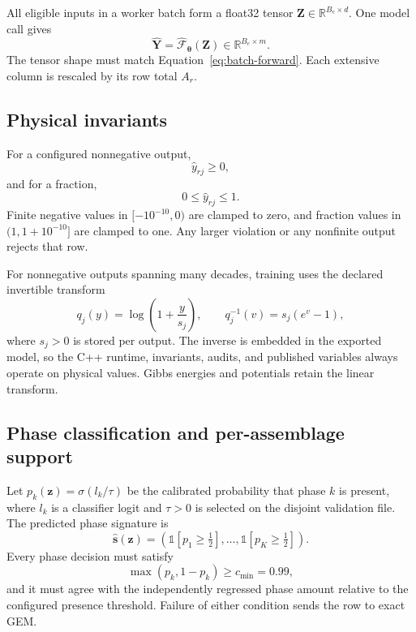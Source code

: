\documentclass[11pt]{article}
\newcommand{\R}{\mathbb{R}}
\begin{document}
All eligible inputs in a worker batch form a float32 tensor
\(\mathbf{Z}\in\R^{B_e\times d}\).  One model call gives
\begin{equation}
  \widehat{\mathbf{Y}}
  =\widehat{\mathcal{F}}_{\boldsymbol{\theta}}(\mathbf{Z})
  \in\R^{B_e\times m}.
  \label{eq:batch-forward}
\end{equation}
The tensor shape must match Equation~\eqref{eq:batch-forward}.  Each extensive column is rescaled
by its row total \(A_r\).

\subsection{Physical invariants}

For a configured nonnegative output,
\begin{equation}
  \widehat y_{rj}\geq0,
  \label{eq:nonnegative}
\end{equation}
and for a fraction,
\begin{equation}
  0\leq\widehat y_{rj}\leq1.
  \label{eq:fraction}
\end{equation}
Finite negative values in \([-10^{-10},0)\) are clamped to zero, and fraction values in
\((1,1+10^{-10}]\) are clamped to one.  Any larger violation or any nonfinite output rejects that
row.

For nonnegative outputs spanning many decades, training uses the declared invertible transform
\begin{equation}
  q_j(y)=\log\left(1+\frac{y}{s_j}\right),
  \qquad
  q_j^{-1}(v)=s_j\left(e^v-1\right),
  \label{eq:log1p-transform}
\end{equation}
where \(s_j>0\) is stored per output.  The inverse is embedded in the exported model, so the C++
runtime, invariants, audits, and published variables always operate on physical values.  Gibbs
energies and potentials retain the linear transform.

\subsection{Phase classification and per-assemblage support}

Let \(p_k(\boldsymbol{z})=\sigma(l_k/\tau)\) be the calibrated probability that phase \(k\) is
present, where \(l_k\) is a classifier logit and \(\tau>0\) is selected on the disjoint validation
file.  The predicted phase signature is
\begin{equation}
  \widehat{\boldsymbol{s}}(\boldsymbol{z})
  =\left(\mathbb{1}[p_1\geq\tfrac12],\ldots,
          \mathbb{1}[p_K\geq\tfrac12]\right).
  \label{eq:phase-signature}
\end{equation}
Every phase decision must satisfy
\begin{equation}
  \max(p_k,1-p_k)\geq c_{\min}=0.99,
  \label{eq:phase-confidence}
\end{equation}
and it must agree with the independently regressed phase amount relative to the configured
presence threshold.  Failure of either condition sends the row to exact GEM.
\end{document}
